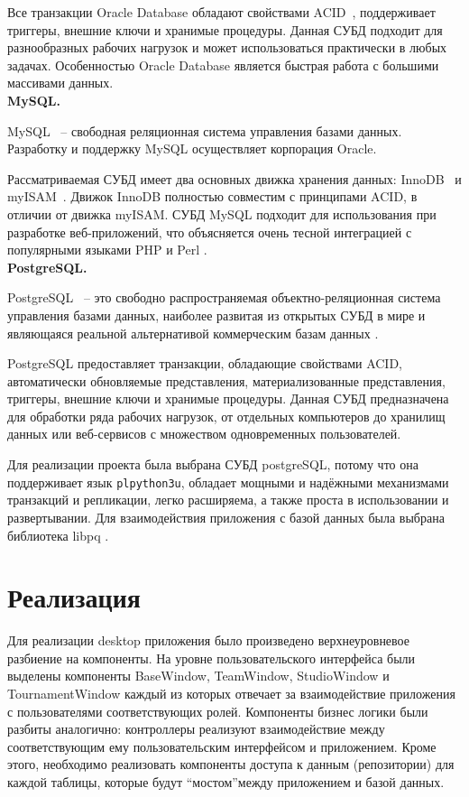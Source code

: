 Все транзакции Oracle Database обладают свойствами ACID~\cite{acid}, поддерживает триггеры, внешние ключи и хранимые процедуры. Данная СУБД подходит для разнообразных рабочих нагрузок и может использоваться практически в любых задачах. Особенностью Oracle Database является быстрая работа с большими массивами данных.\\

\noindent\textbf{MySQL.}

MySQL~\cite{mysql} -- свободная реляционная система управления базами данных. Разработку и поддержку MySQL осуществляет корпорация Oracle.

Рассматриваемая СУБД имеет два основных движка хранения данных: InnoDB~\cite{innodb} и myISAM~\cite{myisam}. Движок InnoDB полностью совместим с принципами ACID, в отличии от движка myISAM. СУБД MySQL подходит для использования при разработке веб-приложений, что объясняется очень тесной интеграцией с популярными языками PHP \cite{php} и Perl \cite{perl}.\\

\noindent\textbf{PostgreSQL.}

PostgreSQL~\cite{postgresql} -- это свободно распространяемая объектно-реляционная система управления базами данных, наиболее развитая из открытых СУБД в мире и являющаяся реальной альтернативой коммерческим базам данных \cite{postgresql-fact}.

PostgreSQL предоставляет транзакции, обладающие свойствами ACID, автоматически обновляемые представления, материализованные представления, триггеры, внешние ключи и хранимые процедуры. Данная СУБД предназначена для обработки ряда рабочих нагрузок, от отдельных компьютеров до хранилищ данных или веб-сервисов с множеством одновременных пользователей. 

Для реализации проекта была выбрана СУБД postgreSQL, потому что она поддерживает язык \texttt{plpython3u}, обладает мощными и надёжными механизмами транзакций и репликации, легко расширяема, а также проста в использовании и развертывании. Для взаимодействия приложения с базой данных была выбрана библиотека libpq \cite{libpq}.

\section{Реализация}
Для реализации desktop приложения было произведено верхнеуровневое разбиение на компоненты. На уровне пользовательского интерфейса были выделены компоненты BaseWindow, TeamWindow, StudioWindow и TournamentWindow каждый из которых отвечает за взаимодействие приложения с пользователями соответствующих ролей. Компоненты бизнес логики были разбиты аналогично: контроллеры реализуют взаимодействие между соответствующим ему пользовательским интерфейсом и приложением. Кроме этого, необходимо реализовать компоненты доступа к данным (репозитории) для каждой таблицы, которые будут \textquotedblleft мостом\textquotedblright \space между приложением и базой данных.

